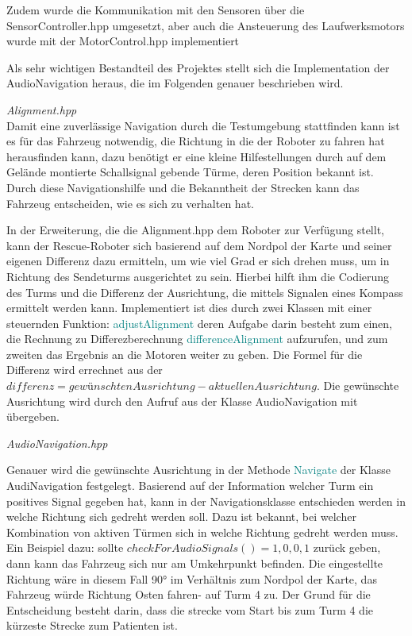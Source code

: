 \documentclass[conference]{IEEEtran}
\begin{document}
{Zudem wurde die Kommunikation mit den Sensoren über die SensorController.hpp umgesetzt, aber auch die Ansteuerung des Laufwerksmotors wurde mit der MotorControl.hpp implementiert
\par
Als sehr wichtigen Bestandteil des Projektes stellt sich die Implementation der AudioNavigation heraus, die im Folgenden genauer beschrieben wird.
\par
\textit{Alignment.hpp}\\
Damit eine zuverlässige Navigation durch die Testumgebung stattfinden kann ist es für das Fahrzeug notwendig, die Richtung in die der Roboter zu fahren hat herausfinden kann, dazu benötigt er eine kleine Hilfestellungen durch auf dem Gelände montierte Schallsignal gebende Türme, deren Position bekannt ist.
Durch diese Navigationshilfe und die Bekanntheit der Strecken kann das Fahrzeug entscheiden, wie es sich zu verhalten hat.
\par 
In der Erweiterung, die die Alignment.hpp dem Roboter zur Verfügung stellt, kann der Rescue-Roboter sich basierend auf dem Nordpol der Karte und seiner eigenen Differenz dazu ermitteln, um wie viel Grad er sich drehen muss, um in Richtung des Sendeturms ausgerichtet zu sein. Hierbei hilft ihm die Codierung des Turms und die Differenz der Ausrichtung, die mittels Signalen eines Kompass ermittelt werden kann. Implementiert ist dies durch zwei Klassen mit einer steuernden Funktion: \textcolor{teal}{adjustAlignment} deren Aufgabe darin besteht zum einen, die Rechnung zu Differezberechnung \textcolor{teal}{differenceAlignment} aufzurufen, und zum zweiten das Ergebnis an die Motoren weiter zu geben. Die Formel für die Differenz wird errechnet aus der $differenz =gewünschtenAusrichtung - aktuellenAusrichtung $. Die gewünschte Ausrichtung wird durch den Aufruf aus der Klasse  AudioNavigation mit übergeben.\par
\par
\textit{AudioNavigation.hpp}
\par
Genauer wird die gewünschte Ausrichtung in der Methode \textcolor{teal}{Navigate} der Klasse AudiNavigation festgelegt. Basierend auf der Information welcher Turm ein positives Signal gegeben hat, kann in der Navigationsklasse entschieden werden in welche Richtung sich gedreht werden soll. 
Dazu ist bekannt, bei welcher Kombination von aktiven Türmen sich in welche Richtung gedreht werden muss. Ein Beispiel dazu: sollte  $checkForAudioSignals() = {1,0,0,1}$ zurück geben, dann kann das Fahrzeug sich nur am Umkehrpunkt befinden. Die eingestellte Richtung wäre in diesem Fall 90° im Verhältnis zum Nordpol der Karte, das Fahrzeug würde Richtung Osten fahren-  auf Turm 4 zu. Der Grund für die Entscheidung besteht darin, dass die strecke vom Start bis zum Turm 4 die kürzeste Strecke zum Patienten ist. 
}
\end{document}
